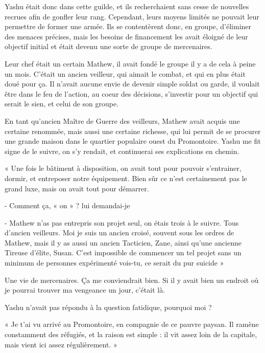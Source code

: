 \documentclass{book}
\begin{document}
Yashu était donc dans cette guilde, et ils recherchaient sans cesse de nouvelles recrues afin de gonfler leur rang. Cependant, leurs moyens limités ne pouvait leur permettre de former une armée. Ils se contentèrent donc, en groupe, d'éliminer des menaces précises, mais les besoins de financement les avait éloigné de leur objectif initial et était devenu une sorte de groupe de mercenaires.\newline

Leur chef était un certain Mathew, il avait fondé le groupe il y a de cela à peine un mois. C'était un ancien veilleur, qui aimait le combat, et qui en plus était doué pour ça. Il n'avait aucune envie de devenir simple soldat ou garde, il voulait être dans le feu de l'action, au coeur des décisions, s'investir pour un objectif qui serait le sien, et celui de son groupe.\newline

En tant qu'ancien Maître de Guerre des veilleurs, Mathew avait acquis une certaine renommée, mais aussi une certaine richesse, qui lui permit de se procurer une grande maison dans le quartier populaire ouest du Promontoire. Yashu me fit signe de le suivre, on s'y rendait, et continuerai ses explications en chemin.\newline

« Une fois le bâtiment à disposition, on avait tout pour pouvoir s'entrainer, dormir, et entreposer notre équipement. Bien sûr ce n'est certainement pas le grand luxe, mais on avait tout pour démarrer.

- Comment ça, « on » ? lui demandai-je

- Mathew n'as pas entrepris son projet seul, on étais trois à le suivre. Tous d'ancien veilleurs. Moi je suis un ancien croisé, souvent sous les ordres de Mathew, mais il y as aussi un ancien Tacticien, Zane, ainsi qu'une ancienne Tireuse d'élite, Susan. C'est impossible de commencer un tel projet sans un minimum de personnes expérimenté vois-tu, ce serait du pur suicide »\newline

Une vie de mercenaires. Ça me conviendrait bien. Si il y avait bien un endroit où je pourrai trouver ma vengeance un jour, c'était là.\newline

Yashu n'avait pas répondu à la question fatidique, pourquoi moi ?\newline

« Je t'ai vu arrivé au Promontoire, en compagnie de ce pauvre paysan. Il ramène constamment des réfugiés, et la raison est simple : il vit assez loin de la capitale, mais vient ici assez régulièrement. »\newline
\end{document}

